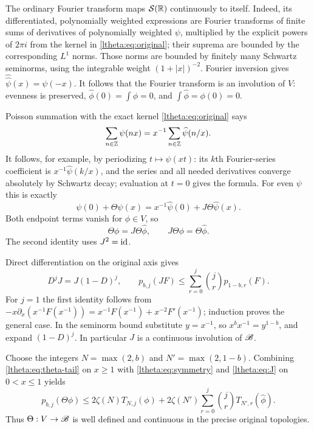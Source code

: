 The ordinary Fourier transform maps $\mathcal S(\mathbb R)$ continuously to itself.
Indeed, its differentiated, polynomially weighted expressions are
Fourier transforms of finite sums of derivatives of polynomially
weighted $\psi$, multiplied by the explicit powers of $2\pi i$ from
the kernel in \eqref{ltheta:eq:original}; their suprema are bounded by the
corresponding $L^1$ norms. Those norms are bounded by finitely many
Schwartz seminorms, using the integrable weight $(1+|x|)^{-2}$.
Fourier inversion gives $\widehat{\widehat\psi}(x)=\psi(-x)$.
It follows that the Fourier transform is an involution of $V$:
evenness is preserved, $\widehat\phi(0)=\int\phi=0$, and
$\int\widehat\phi=\phi(0)=0$.

Poisson summation with the exact kernel \eqref{ltheta:eq:original} says
\[
 \sum_{n\in\mathbb Z}\psi(nx)
    =x^{-1}\sum_{n\in\mathbb Z}\widehat\psi(n/x).
\]
It follows, for example, by periodizing $t\mapsto\psi(xt)$:
its $k$th Fourier-series coefficient is $x^{-1}\widehat\psi(k/x)$,
and the series and all needed derivatives converge absolutely by
Schwartz decay; evaluation at $t=0$ gives the formula.
For even $\psi$ this is exactly
\begin{equation}\label{ltheta:eq:poisson}
 \psi(0)+\Theta\psi(x)
       =x^{-1}\widehat\psi(0)+J\Theta\widehat\psi(x).
\end{equation}
Both endpoint terms vanish for $\phi\in V$, so
\begin{equation}\label{ltheta:eq:symmetry}
 \Theta\phi=J\Theta\widehat\phi,
 \qquad J\Theta\phi=\Theta\widehat\phi.
\end{equation}
The second identity uses $J^2=\operatorname{id}$.

Direct differentiation on the original axis gives
\begin{equation}\label{ltheta:eq:J}
 D^jJ=J(1-D)^j,\qquad
 p_{b,j}(JF)\leq\sum_{r=0}^j\binom jr p_{1-b,r}(F).
\end{equation}
For $j=1$ the first identity follows from
$-x\partial_x(x^{-1}F(x^{-1}))
=x^{-1}F(x^{-1})+x^{-2}F'(x^{-1})$;
induction proves the general case. In the seminorm bound substitute
$y=x^{-1}$, so $x^b x^{-1}=y^{1-b}$, and expand $(1-D)^j$.
In particular $J$ is a continuous involution of $\mathscr B$.

Choose the integers $N=\max(2,b)$ and $N'=\max(2,1-b)$.
Combining \eqref{ltheta:eq:theta-tail} on $x\geq1$ with
\eqref{ltheta:eq:symmetry} and \eqref{ltheta:eq:J} on $0<x\leq1$ yields
\begin{equation}\label{ltheta:eq:theta-continuity}
 p_{b,j}(\Theta\phi)
 \leq2\zeta(N)T_{N,j}(\phi)
  +2\zeta(N')\sum_{r=0}^j\binom jrT_{N',r}(\widehat\phi).
\end{equation}
Thus $\Theta:V\to\mathscr B$ is well defined and continuous in the precise
original topologies.

